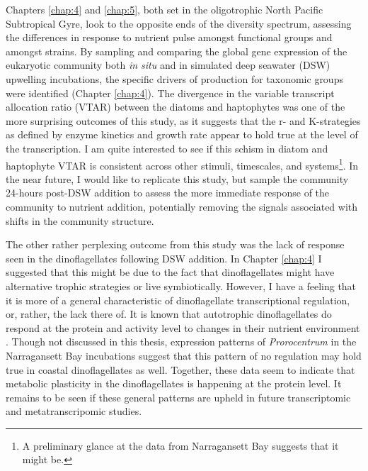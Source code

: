 \par
Chapters \ref{chap:4} and \ref{chap:5}, both set in the oligotrophic North Pacific Subtropical Gyre, look to the opposite ends of the diversity spectrum, assessing the differences in response to nutrient pulse amongst functional groups and amongst strains. By sampling and comparing the global gene expression of the eukaryotic community both \textit{in situ} and in simulated deep seawater (DSW) upwelling incubations, the specific drivers of production for taxonomic groups were identified (Chapter \ref{chap:4}). The divergence in the variable transcript allocation ratio (VTAR) between the diatoms and haptophytes was one of the more surprising outcomes of this study, as it suggests that the r- and K-strategies as defined by enzyme kinetics and growth rate appear to hold true at the level of the transcription. I am quite interested to see if this schism in diatom and haptophyte VTAR is consistent across other stimuli, timescales, and systems\footnote{A preliminary glance at the data from Narragansett Bay suggests that it might be.}. In the near future, I would like to replicate this study, but sample the community 24-hours post-DSW addition to assess the more immediate response of the community to nutrient addition, potentially removing the signals associated with shifts in the community structure. 
\par
The other rather perplexing outcome from this study was the lack of response seen in the dinoflagellates following DSW addition. In Chapter \ref{chap:4} I suggested that this might be due to the fact that dinoflagellates might have alternative trophic strategies or live symbiotically. However, I have a feeling that it is more of a general characteristic of dinoflagellate transcriptional regulation, or, rather, the lack there of. It is known that autotrophic dinoflagellates do respond at the protein and activity level to changes in their nutrient environment \citep{Dyhrman1999}. Though not discussed in this thesis, expression patterns of \textit{Prorocentrum} in the Narragansett Bay incubations suggest that this pattern of no regulation may hold true in coastal dinoflagellates as well. Together, these data seem to indicate that metabolic plasticity in the dinoflagellates is happening at the protein level. It remains to be seen if these general patterns are upheld in future transcriptomic and metatranscripomic studies. 
\par
